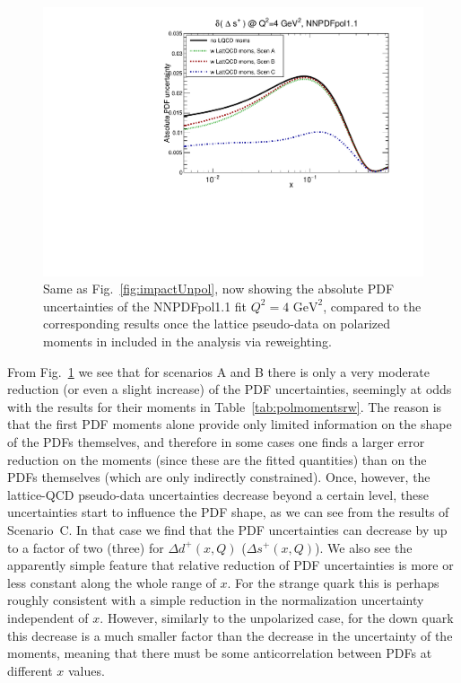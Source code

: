 \begin{figure}[!t]
\includegraphics[scale=0.45]{plots/xsp-pol-lattice-relerr.pdf}
\caption{\small Same as Fig.~\ref{fig:impactUnpol}, now
  showing the absolute PDF uncertainties of the NNPDFpol1.1 fit
  $Q^2=4\text{ GeV}^2$, compared to the corresponding results once the lattice 
  pseudo-data on polarized moments in included in the analysis via reweighting.
}    
\label{fig:impactPol}
\end{figure}

From Fig.~\ref{fig:impactPol} we see that for scenarios
A and B there is only a very moderate reduction (or even a slight increase)
of the PDF uncertainties, seemingly at odds with the results
for their moments in Table~\ref{tab:polmomentsrw}.
%
The reason is that the first PDF moments alone provide only limited
information on the shape of the PDFs themselves, and therefore in some
cases one finds a larger error reduction on the moments (since these
are the fitted quantities) than on the PDFs themselves (which are
only indirectly constrained).
%
Once, however, the lattice-QCD pseudo-data uncertainties
decrease beyond a certain level, these uncertainties start to influence the 
PDF shape, as we can see from the results of Scenario~C.
%
In that case we find that the PDF uncertainties can decrease by up to a factor
of two (three) for $\Delta d^+(x,Q)$ ($\Delta s^+(x,Q)$).
%
We also see the apparently simple feature that relative reduction of PDF 
uncertainties is more or less constant along the whole range of $x$. 
%
For the strange quark this is perhaps roughly consistent with a simple 
reduction in the normalization uncertainty independent of $x$.
%
However, similarly to the unpolarized case, for the down quark this 
decrease is a much smaller factor than the decrease in the uncertainty 
of the moments, meaning that there must be some anticorrelation between 
PDFs at different $x$ values.  


